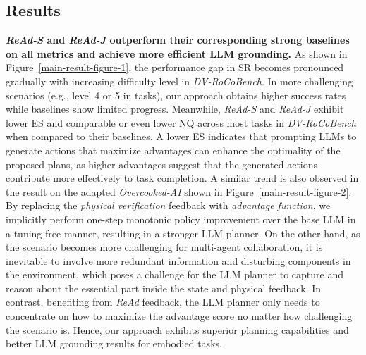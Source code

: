 \documentclass[11pt]{article}
\theoremstyle{plain}
\theoremstyle{remark}
\begin{document}
\subsection{Results} \label{section:5-2}
\textbf{\emph{ReAd-S} and \emph{ReAd-J} outperform their corresponding strong baselines on all metrics and achieve more efficient LLM grounding.}
As shown in Figure~\ref{main-result-figure-1}, the performance gap in SR becomes pronounced gradually with increasing difficulty level in \emph{DV-RoCoBench}.
In more challenging scenarios (e.g., level 4 or 5 in tasks), our approach obtains higher success rates while baselines show limited progress. Meanwhile, \emph{ReAd-S} and \emph{ReAd-J} exhibit lower ES and comparable or even lower NQ across most tasks in \emph{DV-RoCoBench} when compared to their baselines.
A lower ES indicates that prompting LLMs to generate actions that maximize advantages can enhance the optimality of the proposed plans, as higher advantages suggest that the generated actions contribute more effectively to task completion.
A similar trend is also observed in the result on the adapted \emph{Overcooked-AI} shown in Figure~\ref{main-result-figure-2}.
By replacing the \emph{physical verification} feedback with \emph{advantage function}, we implicitly perform one-step monotonic policy improvement over the base LLM in a tuning-free manner, resulting in a stronger LLM planner.
On the other hand, as the scenario becomes more challenging for multi-agent collaboration, it is inevitable to involve more redundant information and disturbing components in the environment, which poses a challenge for the LLM planner to capture and reason about the essential part inside the state and physical feedback. In contrast, benefiting from \emph{ReAd} feedback, the LLM planner only needs to concentrate on how to maximize the advantage score no matter how challenging the scenario is. Hence, our approach exhibits superior planning capabilities and better LLM grounding results for embodied tasks.
\end{document}
